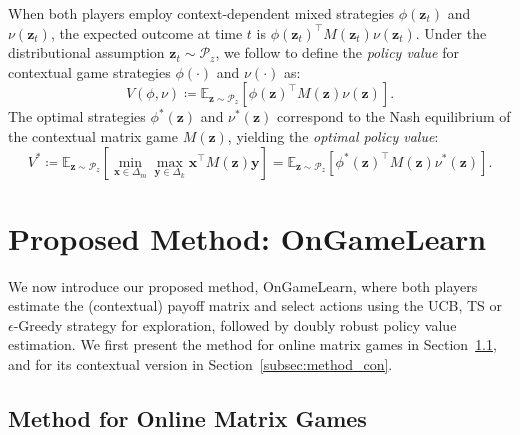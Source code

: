\documentclass[12pt]{article}
\begin{document}
When both players employ context-dependent mixed strategies $\phi(\bm{z}_t)$ and $\nu(\bm{z}_t)$, the expected outcome at time $t$ is $\phi(\bm{z}_t)^\top M(\bm{z}_t) \nu(\bm{z}_t)$. Under the distributional assumption $\bm{z}_t \sim \mathcal{P}_z$, we follow \citet{dudik2011doubly} to define the \textit{policy value} for contextual game strategies $\phi(\cdot)$ and $\nu(\cdot)$ as:
\begin{equation*}
    V(\phi,\nu) \coloneqq \mathbb{E}_{\bm{z}\sim \mathcal{P}_z} \left[\phi(\bm{z})^\top M(\bm{z}) \nu(\bm{z}) \right].
\end{equation*}
The optimal strategies $\phi^\ast(\bm{z})$ and $\nu^\ast(\bm{z})$ correspond to the Nash equilibrium of the contextual matrix game $M(\bm{z})$, yielding the \textit{optimal policy value}:
\begin{equation*}
    V^\ast \coloneqq \mathbb{E}_{\bm{z}\sim \mathcal{P}_z} \left[\min_{\bm{x}\in \Delta_{m}}\max_{\bm{y}\in \Delta_{k}} \bm{x}^\top M(\bm{z}) \bm{y} \right] = \mathbb{E}_{\bm{z}\sim \mathcal{P}_z} \left[\phi^\ast(\bm{z})^\top M(\bm{z}) \nu^\ast(\bm{z})\right].
\end{equation*}



\section{Proposed Method: OnGameLearn}
\label{sec:policy}

We now introduce our proposed method, OnGameLearn, where both players estimate the (contextual) payoff matrix and select actions using the UCB, TS or $\epsilon$-Greedy strategy for exploration, followed by doubly robust policy value estimation. We first present the method for online matrix games in Section~\ref{subsec:method_matrix}, and for its contextual version in Section~\ref{subsec:method_con}.

\subsection{Method for Online Matrix Games}
\label{subsec:method_matrix}
\end{document}
